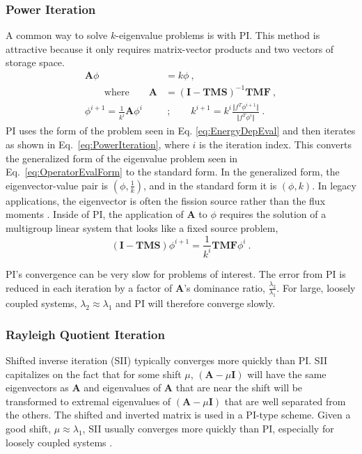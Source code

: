 \documentclass{article}                                                                           %
\newcommand{\ve}[1]{\ensuremath{\mathbf{#1}}}
\begin{document}
\subsubsection{Power Iteration}
A common way to solve $k$-eigenvalue problems is with PI. This method is attractive because it only requires matrix-vector products and two vectors of storage space. 
%
\begin{align}
  \ve{A}\phi &= k\phi \:, \label{eq:EnergyDepEval} \\
  \qquad \text{where}  \qquad \ve{A} &= (\ve{I} - \ve{TMS})^{-1} \ve{TMF} \:, \nonumber \\
  \phi^{i+1} = \frac{1}{k^i}\ve{A}\phi^{i} &\:; \qquad 
  k^{i+1} = k^i \frac{\Vert f^T \phi^{i+1} \Vert}{\Vert f^T \phi^i\Vert} \:.
  \label{eq:PowerIteration}
\end{align} 
%
PI uses the form of the problem seen in Eq. \eqref{eq:EnergyDepEval} and then iterates as shown in Eq.\ \eqref{eq:PowerIteration}, where $i$ is the iteration index. This converts the generalized form of the eigenvalue problem seen in Eq.\ \eqref{eq:OperatorEvalForm} to the standard form. In the generalized form, the eigenvector-value pair is $(\phi, \frac{1}{k})$, and in the standard form it is $(\phi, k)$.
In legacy applications, the eigenvector is often the fission source rather than the flux moments \cite{Lewis1993,Evans2011}.
Inside of PI, the application of $\ve{A}$ to $\phi$ requires the solution of a multigroup linear system that looks like a fixed source problem,
\begin{equation}
  (\ve{I} - \ve{TMS})\phi^{i+1} = \frac{1}{k^i}\ve{TMF}\phi^{i} \:. \label{eq:EvalDepFxdSource}
\end{equation}

PI's convergence can be very slow for problems of interest.  The error from PI is reduced in each iteration by a factor of $\ve{A}$'s dominance ratio, $\frac{\lambda_{2}}{\lambda_{1}}$. For large, loosely coupled systems, $\lambda_2 \approx \lambda_1$ and PI will therefore converge slowly.

\subsubsection{Rayleigh Quotient Iteration}
Shifted inverse iteration (SII) typically converges more quickly than PI. SII capitalizes on the fact that for some shift $\mu$, $(\ve{A} - \mu \ve{I})$ will have the same eigenvectors as $\ve{A}$ and eigenvalues of $\ve{A}$ that are near the shift will be transformed to extremal eigenvalues of $(\ve{A} - \mu \ve{I})$ that are well separated from the others. The shifted and inverted matrix is used in a PI-type scheme. Given a good shift, $\mu \approx \lambda_1$, SII usually converges more quickly than PI, especially for loosely coupled systems \cite{Allen2002}.
\end{document}
